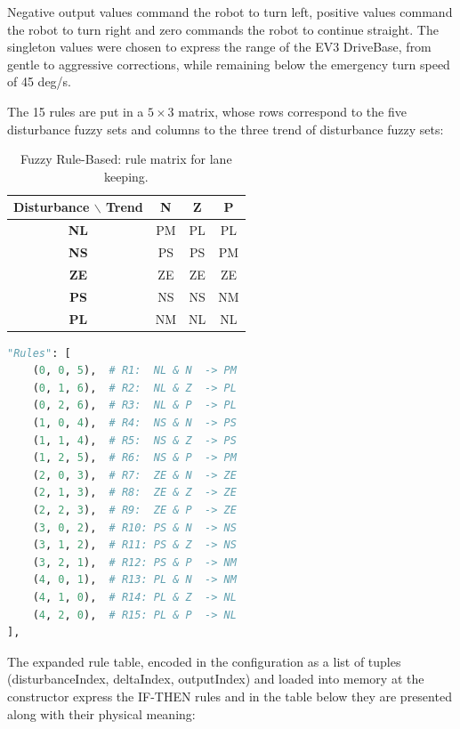 Negative output values command the robot to turn left, positive values command the robot to turn right and zero commands the robot to continue straight. The singleton values were chosen to express the range of the EV3 DriveBase, from gentle to aggressive corrections, while remaining below the emergency turn speed of 45 deg/s.

The 15 rules are put in a $5\times3$ matrix, whose rows correspond to the five disturbance fuzzy sets and columns to the three trend of disturbance fuzzy sets:

\begin{table}[htbp]
\centering
\caption{Fuzzy Rule-Based: rule matrix for lane keeping.}
\label{tab:rule-matrix-full}
\begin{tabular}{c|c|c|c}
\hline
\textbf{Disturbance $\backslash$ Trend} & \textbf{N} & \textbf{Z} & \textbf{P} \\
\hline
\textbf{NL} & PM & PL & PL \\
\textbf{NS} & PS & PS & PM \\
\textbf{ZE} & ZE & ZE & ZE \\
\textbf{PS} & NS & NS & NM \\
\textbf{PL} & NM & NL & NL \\
\hline
\end{tabular}
\end{table}

\begin{lstlisting}[language=Python, caption={FuzzyRuleBasedAlgorithm rules tuple}, label={lst:lk-init}]
"Rules": [
    (0, 0, 5),  # R1:  NL & N  -> PM
    (0, 1, 6),  # R2:  NL & Z  -> PL
    (0, 2, 6),  # R3:  NL & P  -> PL
    (1, 0, 4),  # R4:  NS & N  -> PS
    (1, 1, 4),  # R5:  NS & Z  -> PS
    (1, 2, 5),  # R6:  NS & P  -> PM
    (2, 0, 3),  # R7:  ZE & N  -> ZE
    (2, 1, 3),  # R8:  ZE & Z  -> ZE
    (2, 2, 3),  # R9:  ZE & P  -> ZE
    (3, 0, 2),  # R10: PS & N  -> NS
    (3, 1, 2),  # R11: PS & Z  -> NS
    (3, 2, 1),  # R12: PS & P  -> NM
    (4, 0, 1),  # R13: PL & N  -> NM
    (4, 1, 0),  # R14: PL & Z  -> NL
    (4, 2, 0),  # R15: PL & P  -> NL
],
\end{lstlisting}

The expanded rule table, encoded in the configuration as a list of tuples (disturbanceIndex, deltaIndex, outputIndex) and loaded into memory at the constructor express the IF-THEN rules and in the table below they are presented along with their physical meaning:

